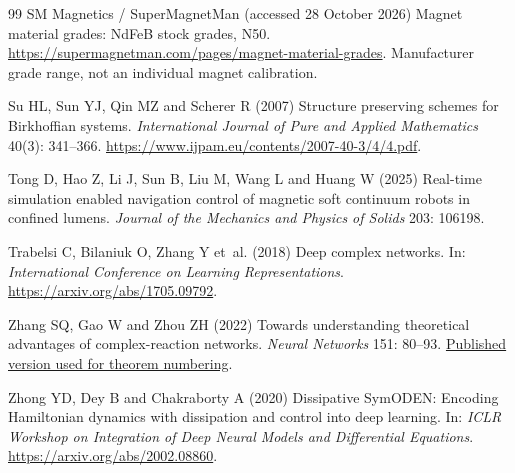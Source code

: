 \begin{thebibliography}{99}
SM Magnetics / SuperMagnetMan (accessed 28 October 2026) Magnet material grades: NdFeB stock grades, N50.
\url{https://supermagnetman.com/pages/magnet-material-grades}.
Manufacturer grade range, not an individual magnet calibration.

Su HL, Sun YJ, Qin MZ and Scherer R (2007) Structure preserving schemes for Birkhoffian systems.
\textit{International Journal of Pure and Applied Mathematics} 40(3): 341--366.
\url{https://www.ijpam.eu/contents/2007-40-3/4/4.pdf}.

Tong D, Hao Z, Li J, Sun B, Liu M, Wang L and Huang W (2025)
Real-time simulation enabled navigation control of magnetic soft continuum robots in confined lumens.
\textit{Journal of the Mechanics and Physics of Solids} 203: 106198.

Trabelsi C, Bilaniuk O, Zhang Y et~al. (2018) Deep complex networks.
In: \textit{International Conference on Learning Representations}.
\url{https://arxiv.org/abs/1705.09792}.

Zhang SQ, Gao W and Zhou ZH (2022) Towards understanding theoretical advantages of
complex-reaction networks. \textit{Neural Networks} 151: 80--93.
\href{https://www.lamda.nju.edu.cn/zhangsq/papers/2022-CRNet-NN.pdf}{Published version used for theorem numbering}.

Zhong YD, Dey B and Chakraborty A (2020) Dissipative SymODEN: Encoding Hamiltonian
dynamics with dissipation and control into deep learning.
In: \textit{ICLR Workshop on Integration of Deep Neural Models and Differential Equations}.
\url{https://arxiv.org/abs/2002.08860}.
\end{thebibliography}
